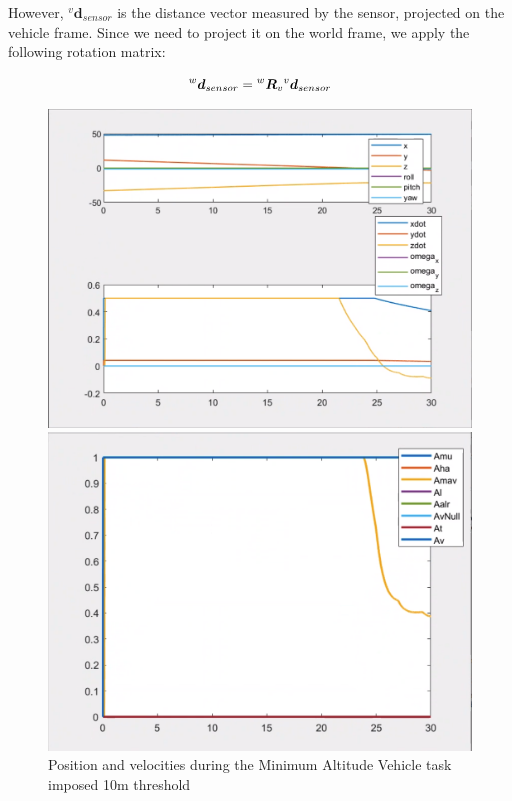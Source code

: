 \documentclass{article}
\begin{document}
 However, ${^{v}\boldsymbol{d}_{sensor}}$ is the distance vector measured by the sensor, projected on the vehicle frame. Since we need to project it on the world frame, we apply the following rotation matrix:
 
 \begin{equation}
 \large
     {^{w}\boldsymbol{d}_{sensor}} = {^{w}\boldsymbol{R}_{v}} {^{v}\boldsymbol{d}_{sensor}}
 \end{equation}



\begin{figure}[htpb] 
\begin{minipage}{0.40\textwidth}  
\includegraphics[width=\textwidth]{123_10m_ppdot.png}
\caption{Position and velocities during the Minimum Altitude Vehicle task imposed 10m threshold}\label{10m_ppdot} 
\end{minipage}  
\hspace{0.2\textwidth} 
\begin{minipage}{0.43\textwidth}  
\includegraphics[width=\textwidth]{123_10m_A.png}

\end{minipage}
\end{figure}
\end{document}
